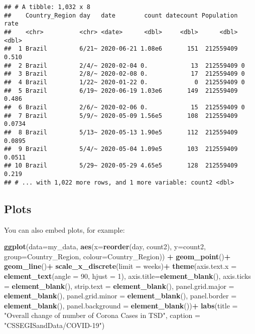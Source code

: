 \documentclass[]{article}
\newenvironment{Shaded}{\begin{snugshade}}{\end{snugshade}}
\newcommand{\DataTypeTok}[1]{\textcolor[rgb]{0.13,0.29,0.53}{#1}}
\newcommand{\DecValTok}[1]{\textcolor[rgb]{0.00,0.00,0.81}{#1}}
\newcommand{\KeywordTok}[1]{\textcolor[rgb]{0.13,0.29,0.53}{\textbf{#1}}}
\newcommand{\NormalTok}[1]{#1}
\newcommand{\OperatorTok}[1]{\textcolor[rgb]{0.81,0.36,0.00}{\textbf{#1}}}
\newcommand{\StringTok}[1]{\textcolor[rgb]{0.31,0.60,0.02}{#1}}
\begin{document}
\begin{verbatim}
## # A tibble: 1,032 x 8
##    Country_Region day   date        count datecount Population   rate
##    <chr>          <chr> <date>      <dbl>     <dbl>      <dbl>  <dbl>
##  1 Brazil         6/21~ 2020-06-21 1.08e6       151  212559409 0.510 
##  2 Brazil         2/4/~ 2020-02-04 0.            13  212559409 0     
##  3 Brazil         2/8/~ 2020-02-08 0.            17  212559409 0     
##  4 Brazil         1/22~ 2020-01-22 0.             0  212559409 0     
##  5 Brazil         6/19~ 2020-06-19 1.03e6       149  212559409 0.486 
##  6 Brazil         2/6/~ 2020-02-06 0.            15  212559409 0     
##  7 Brazil         5/9/~ 2020-05-09 1.56e5       108  212559409 0.0734
##  8 Brazil         5/13~ 2020-05-13 1.90e5       112  212559409 0.0895
##  9 Brazil         5/4/~ 2020-05-04 1.09e5       103  212559409 0.0511
## 10 Brazil         5/29~ 2020-05-29 4.65e5       128  212559409 0.219 
## # ... with 1,022 more rows, and 1 more variable: count2 <dbl>
\end{verbatim}

\hypertarget{plots}{%
\subsection{Plots}\label{plots}}

You can also embed plots, for example:

\begin{Shaded}
\begin{Highlighting}[]
\KeywordTok{ggplot}\NormalTok{(}\DataTypeTok{data=}\NormalTok{my_data, }\KeywordTok{aes}\NormalTok{(}\DataTypeTok{x=}\KeywordTok{reorder}\NormalTok{(day, count2), }\DataTypeTok{y=}\NormalTok{count2, }\DataTypeTok{group=}\NormalTok{Country_Region, }\DataTypeTok{colour=}\NormalTok{Country_Region)) }\OperatorTok{+}
\StringTok{  }\KeywordTok{geom_point}\NormalTok{()}\OperatorTok{+}
\StringTok{  }\KeywordTok{geom_line}\NormalTok{()}\OperatorTok{+}
\StringTok{  }\KeywordTok{scale_x_discrete}\NormalTok{(}\DataTypeTok{limit =}\NormalTok{ weeks)}\OperatorTok{+}
\StringTok{  }\KeywordTok{theme}\NormalTok{(}\DataTypeTok{axis.text.x =} \KeywordTok{element_text}\NormalTok{(}\DataTypeTok{angle =} \DecValTok{90}\NormalTok{, }\DataTypeTok{hjust =} \DecValTok{1}\NormalTok{),}
        \DataTypeTok{axis.title=}\KeywordTok{element_blank}\NormalTok{(),}
        \DataTypeTok{axis.ticks =} \KeywordTok{element_blank}\NormalTok{(),}
        \DataTypeTok{strip.text =} \KeywordTok{element_blank}\NormalTok{(),}
        \DataTypeTok{panel.grid.major =} \KeywordTok{element_blank}\NormalTok{(), }
        \DataTypeTok{panel.grid.minor =} \KeywordTok{element_blank}\NormalTok{(), }
        \DataTypeTok{panel.border =} \KeywordTok{element_blank}\NormalTok{(), }
        \DataTypeTok{panel.background =} \KeywordTok{element_blank}\NormalTok{())}\OperatorTok{+}
\StringTok{ }\KeywordTok{labs}\NormalTok{(}\DataTypeTok{title =}  \StringTok{"Overall change of number of Corona Cases in TSD"}\NormalTok{,}
       \DataTypeTok{caption =} \StringTok{"CSSEGISandData/COVID-19"}\NormalTok{)}
\end{Highlighting}
\end{Shaded}
\end{document}
